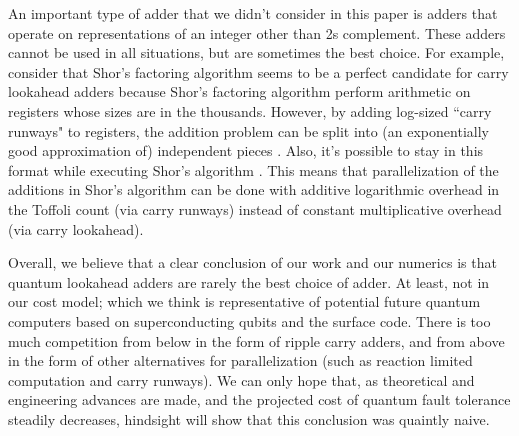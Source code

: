 \documentclass[onecolumn,unpublished]{quantumarticle}
\theoremstyle{definition}
\theoremstyle{definition}
\theoremstyle{definition}
\begin{document}
An important type of adder that we didn't consider in this paper is adders that operate on representations of an integer other than 2s complement.
These adders cannot be used in all situations, but are sometimes the best choice.
For example, consider that Shor's factoring algorithm \cite{shor1994algorithms} seems to be a perfect candidate for carry lookahead adders because Shor's factoring algorithm perform arithmetic on registers whose sizes are in the thousands.
However, by adding log-sized ``carry runways" to registers, the addition problem can be split into (an exponentially good approximation of) independent pieces \cite{gidney2019approximate}.
Also, it's possible to stay in this format while executing Shor's algorithm \cite{gidney2019factor}.
This means that parallelization of the additions in Shor's algorithm can be done with additive logarithmic overhead in the Toffoli count (via carry runways) instead of constant multiplicative overhead (via carry lookahead).

Overall, we believe that a clear conclusion of our work and our numerics is that quantum lookahead adders are rarely the best choice of adder.
At least, not in our cost model; which we think is representative of potential future quantum computers based on superconducting qubits and the surface code.
There is too much competition from below in the form of ripple carry adders, and from above in the form of other alternatives for parallelization (such as reaction limited computation and carry runways).
We can only hope that, as theoretical and engineering advances are made, and the projected cost of quantum fault tolerance steadily decreases, hindsight will show that this conclusion was quaintly naive.





\end{document}

